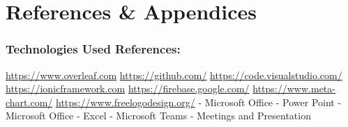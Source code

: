 \chapter{References \& Appendices}

\subsection{Technologies Used References:}
\url{https://www.overleaf.com}
\newline
\url{https://github.com/}
\newline
\url{https://code.visualstudio.com/}
\newline
\url{https://ionicframework.com}
\newline
\url{https://firebase.google.com/}
\newline
\url{https://www.meta-chart.com/}
\newline
\url{https://www.freelogodesign.org/}
\newline
- Microsoft Office - Power Point
\newline
- Microsoft Office - Excel
\newline
- Microsoft Teams - Meetings and Presentation

